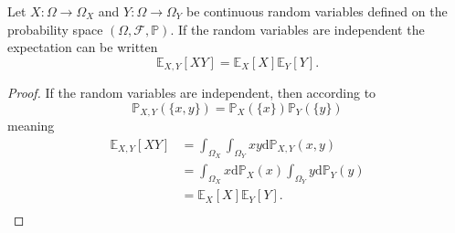 \begin{theorem}
	\label{theorem:expectation_independent}
	Let $X\colon \Omega \to \Omega_X$ and $Y\colon \Omega \to \Omega_Y$ be continuous random variables defined on the probability space $(\Omega, \mathcal{F}, \mathbb{P})$. If the random variables are independent the expectation can be written
	\begin{equation}
		\mathbb{E}_{X,Y}[XY]=\mathbb{E}_X[X]\mathbb{E}_Y[Y].
	\end{equation}
\end{theorem}

\begin{proof}
	If the random variables are independent, then according to 
	\begin{equation}
		\mathbb{P}_{X,Y}(\{x,y\})=\mathbb{P}_{X}(\{x\})\mathbb{P}_{Y}(\{y\})
	\end{equation}
	meaning
	\begin{equation}
		\begin{split}
			\mathbb{E}_{X,Y}[XY] &= \int_{\Omega_X}\int_{\Omega_Y}xy\mathrm{d}\mathbb{P}_{X,Y}(x,y)\\
			&= \int_{\Omega_X}x\mathrm{d}\mathbb{P}_X(x)\int_{\Omega_Y}y\mathrm{d}\mathbb{P}_Y(y)\\
			&= \mathbb{E}_X[X]\mathbb{E}_Y[Y].\\
		\end{split}
	\end{equation}
\end{proof}

